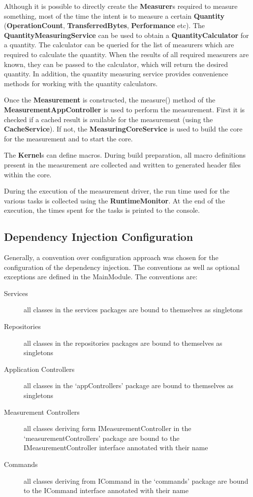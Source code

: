 \documentclass[a4paper,12pt]{report}
\newcommand{\class}[1]{\textbf{#1}}
\newcommand{\method}[1]{\textsf{#1}}
\begin{document}
Although it is possible to directly create the \class{Measurer}s required to
measure something, most of the time the intent is to measure a certain
\class{Quantity} (\class{OperationCount}, \class{TransferredBytes},
\class{Performance} etc). The \class{QuantityMeasuringService} can be used to
obtain a \class{QuantityCalculator} for a quantity. The calculator can be
queried for the list of measurers which are required to calculate the quantity.
When the results of all required measurers are known, they can be passed to the
calculator, which will return the desired quantity. In addition, the quantity
measuring service provides convenience methods for working with the quantity
calculators.

Once the \class{Measurement} is constructed, the \method{measure()} method of
the  \class{MeasurementAppController} is used to perform the measurement. First
it is checked if a cached result is available for the measurement (using the
\class{CacheService}). If not, the \class{MeasuringCoreService} is used to build
the core for the measurement and to start the core.

The \class{Kernel}s can define macros. During build preparation, all macro
definitions present in the measurement are collected and written to generated
header files within the core.

During the execution of the measurement driver, the run time used for the
various tasks is collected using the \class{RuntimeMonitor}. At the end of the
execution, the times spent for the tasks is printed to the console.


\subsection{Dependency Injection Configuration}
Generally, a convention over configuration approach was chosen for the
configuration of the dependency injection. The conventions as well as optional
exceptions are defined in the MainModule. 
The conventions are:
\begin{description}
\item[Services] all classes in the services packages are bound to themselves as
singletons
\item[Repositories] all classes in the repositories packages are bound to
themselves as singletons
\item[Application Controllers] all classes in the `appControllers' package are
bound to themselves as singletons
\item[Measurement Controllers] all classes deriving form IMeasurementController
in the `measurementControllers' package are bound to the IMeasurementController
interface annotated with their name
\item[Commands] all classes deriving from ICommand in the `commands' package are
bound to the ICommand interface annotated with their name
\end{description}
\end{document}
